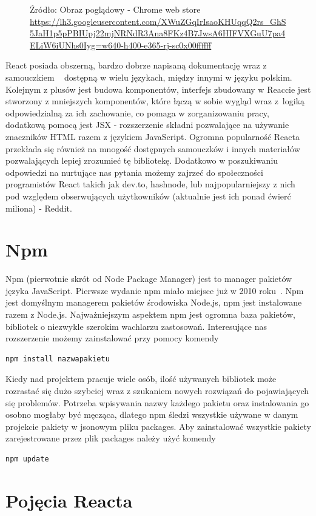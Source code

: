 \documentclass[oneside,polski,logo,indent]{amuthesis}
\begin{document}
{\begin{figure}[H]
{\newline
Źródło: Obraz poglądowy - Chrome web store
 \url{https://lh3.googleusercontent.com/XWuZGqIrIsaoKHUqqQ2rs_GhS5JaH1p5pPBIUpj22mjNRNdR3Ana8FKz4B7JwsA6HIFVXGuU7pa4ELiW6iUNhs0Iyg=w640-h400-e365-rj-sc0x00ffffff}
}
\label{react dev example.jpg}
\end{figure}
React posiada obszerną, bardzo dobrze napisaną dokumentację wraz z samouczkiem 
~\cite{reactjs} dostępną w wielu językach, między innymi w języku polskim.
Kolejnym z plusów jest budowa komponentów, interfejs zbudowany w Reaccie jest stworzony z mniejszych komponentów, które łączą w sobie wygląd wraz z~logiką odpowiedzialną za ich zachowanie, co pomaga w zorganizowaniu pracy, dodatkową pomocą jest JSX - rozszerzenie składni pozwalające na używanie znaczników HTML razem z językiem JavaScript.
Ogromna popularność Reacta przekłada się również na mnogość dostępnych samouczków i innych materiałów pozwalających lepiej zrozumieć tę bibliotekę. Dodatkowo w poszukiwaniu odpowiedzi na nurtujące nas pytania możemy zajrzeć do społeczności programistów React takich jak dev.to, hashnode, lub najpopularniejszy z nich pod względem obserwujących użytkowników (aktualnie jest ich ponad ćwierć miliona) - Reddit.
}
\section{Npm}{
Npm (pierwotnie skrót od Node Package Manager) jest to manager pakietów języka JavaScript. Pierwsze wydanie npm miało miejsce już w 2010 roku~\cite{npmwiki}.
Npm jest domyślnym managerem pakietów środowiska Node.js, npm jest instalowane razem z Node.js. Najważniejszym aspektem npm jest ogromna baza pakietów, bibliotek o 
niezwykle szerokim wachlarzu zastosowań. Interesujące nas rozszerzenie możemy zainstalować przy pomocy komendy
\begin{lstlisting}
npm install nazwapakietu
\end{lstlisting}
Kiedy nad projektem pracuje wiele osób, ilość używanych bibliotek może rozrastać się dużo szybciej wraz z szukaniem nowych rozwiązań do pojawiających się problemów.
Potrzeba wpisywania nazwy każdego pakietu oraz instalowania go osobno mogłaby być męcząca, dlatego npm śledzi wszystkie używane w danym projekcie pakiety w jsonowym pliku
packages. Aby zainstalować wszystkie pakiety zarejestrowane przez plik packages należy użyć komendy
\begin{lstlisting}
npm update
\end{lstlisting}
}
\section{Pojęcia Reacta}
\end{document}
